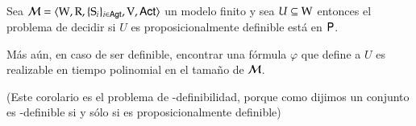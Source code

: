     

    




\begin{corolario}
    Sea $\mathcal{M}=\langle \mathrm{W},\mathrm{R},\{ \mathrm{S}_i \}_{i \in {\rm \sf Agt}},\mathrm{V},{\rm \sf Act} \rangle$ un modelo finito y sea $U \subseteq \mathrm{W}$ entonces el problema de decidir si $U$ es proposicionalmente definible está en $\rm\textsf{P}$.

    Más aún, en caso de ser definible, encontrar una fórmula $\varphi$ que define a $U$ es realizable en tiempo polinomial en el tamaño de $\mathcal{M}$.
\end{corolario}
(Este corolario es el problema de \KHilogic-definibilidad, porque como dijimos un conjunto es \KHilogic-definible si y sólo si es proposicionalmente definible)

